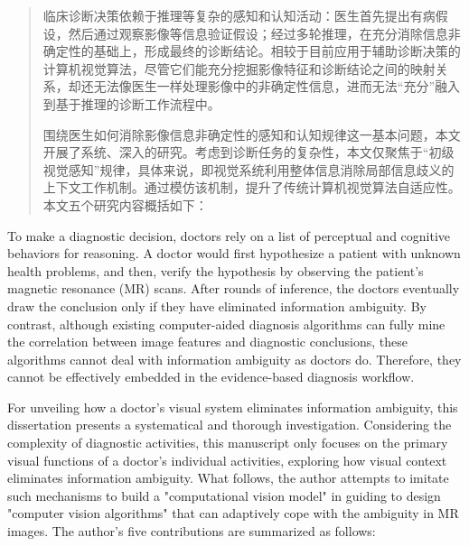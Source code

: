 
\begin{abstract}
临床诊断决策依赖于推理等复杂的感知和认知活动：医生首先提出有病假设，然后通过观察影像等信息验证假设；经过多轮推理，在充分消除信息非确定性的基础上，形成最终的诊断结论。相较于目前应用于辅助诊断决策的计算机视觉算法，尽管它们能充分挖掘影像特征和诊断结论之间的映射关系，却还无法像医生一样处理影像中的非确定性信息，进而无法“充分”融入到基于推理的诊断工作流程中。


围绕医生如何消除影像信息非确定性的感知和认知规律这一基本问题，本文开展了系统、深入的研究。考虑到诊断任务的复杂性，本文仅聚焦于“初级视觉感知”规律，具体来说，即视觉系统利用整体信息消除局部信息歧义的上下文工作机制。通过模仿该机制，提升了传统计算机视觉算法自适应性。本文五个研究内容概括如下：



 \par
\end{abstract}

\begin{englishabstract}



To make a diagnostic decision, doctors rely on a list of perceptual and cognitive behaviors for reasoning. A doctor would first hypothesize a patient with unknown health problems, and then, verify the hypothesis by observing the patient's magnetic resonance (MR) scans. After rounds of inference, the doctors eventually draw the conclusion only if they have eliminated information ambiguity. By contrast, although existing computer-aided diagnosis algorithms can fully mine the correlation between image features and diagnostic conclusions, these algorithms cannot deal with information ambiguity as doctors do. Therefore, they cannot be effectively embedded in the evidence-based diagnosis workflow.


For unveiling how a doctor's visual system eliminates information ambiguity, this dissertation presents a systematical and thorough investigation. Considering the complexity of diagnostic activities, this manuscript only focuses on the primary visual functions of a doctor's individual activities, exploring  how visual context eliminates information ambiguity. What follows,  the author attempts to imitate such mechanisms to build a "computational vision model" in guiding to design "computer vision algorithms" that can adaptively cope with the ambiguity in MR images. The author's five contributions are summarized as follows:




 \par %
\end{englishabstract}

\NWUpremainmatter
